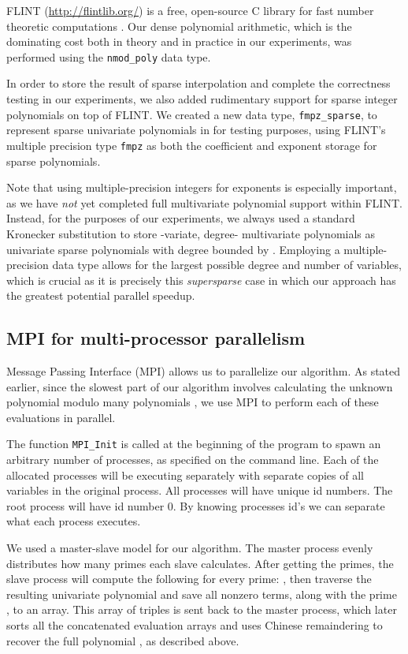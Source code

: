 \documentclass[letterpaper,10pt]{article}
\def\cite{\citep}
\begin{document}
FLINT (\url{http://flintlib.org/}) is a free, open-source C library for
fast number theoretic computations \cite{flint}. Our dense polynomial
arithmetic, which is the dominating cost both in theory and in practice
in our experiments, was performed using the \verb|nmod_poly| data type.

In order to store the result of sparse interpolation and complete the
correctness testing in our experiments, we also added rudimentary
support for sparse integer polynomials on top of FLINT. We created a new
data type, \verb|fmpz_sparse|, to represent sparse univariate
polynomials in  for testing purposes, using FLINT's multiple
precision type \verb|fmpz| as both the coefficient and exponent storage
for sparse polynomials. 

Note that using multiple-precision integers for
exponents is especially important, as we have \emph{not} yet completed
full multivariate polynomial support within FLINT. Instead, for the
purposes of our experiments, we always used a standard Kronecker
substitution to store -variate, degree- 
multivariate polynomials as univariate sparse
polynomials with degree bounded by . Employing a multiple-precision
data type allows for the largest possible degree and number of
variables, which is crucial as it is precisely this \emph{supersparse}
case in which our approach has the greatest potential parallel speedup.

\subsection{MPI for multi-processor parallelism}
 Message Passing Interface (MPI) allows us to parallelize our algorithm. 
 As stated earlier, since the slowest part of our algorithm involves calculating 
 the unknown polynomial  modulo many polynomials , we
 use MPI to perform each of these evaluations in parallel.

 The function \verb|MPI_Init|
 is called at the beginning of the program to spawn an arbitrary number
 of processes, as specified on the command line.
 Each of the allocated processes will be
 executing separately with separate copies of all variables in the original 
 process. All processes will have unique id numbers. The root process
 will have id number 0. By knowing processes id's we can separate what each
 process executes. 
 
 We used a master-slave model for our algorithm. The master 
 process evenly distributes how many primes each slave calculates. After getting 
 the primes, the slave process will compute the following for every prime:
 , then
 traverse the resulting univariate polynomial 
 and save all nonzero terms, along with the prime , to an array.
 This array of triples is sent back to the master process, which later
 sorts all the concatenated evaluation arrays
 and uses Chinese remaindering to recover the full polynomial
 , as described above.
\end{document}
